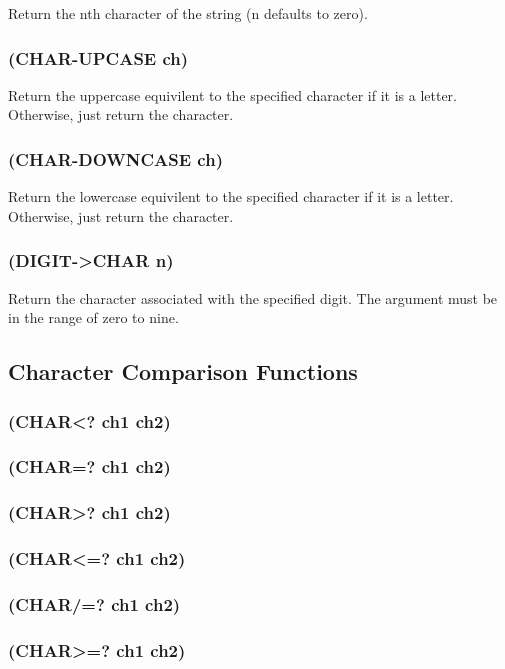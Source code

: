 \documentclass[11pt]{article}
\begin{document}
Return the nth character of the string (n defaults to zero).
\subsubsection{(CHAR-UPCASE ch)}
\label{sec-4-30-9}

Return the uppercase equivilent to the specified character if it is a
letter.  Otherwise, just return the character.
\subsubsection{(CHAR-DOWNCASE ch)}
\label{sec-4-30-10}

Return the lowercase equivilent to the specified character if it is a
letter.  Otherwise, just return the character.
\subsubsection{(DIGIT->CHAR n)}
\label{sec-4-30-11}

Return the character associated with the specified digit.  The
argument must be in the range of zero to nine.
\subsection{Character Comparison Functions}
\label{sec-4-31}

\subsubsection{(CHAR<? ch1 ch2)}
\label{sec-4-31-1}
\subsubsection{(CHAR=? ch1 ch2)}
\label{sec-4-31-2}
\subsubsection{(CHAR>? ch1 ch2)}
\label{sec-4-31-3}
\subsubsection{(CHAR<=? ch1 ch2)}
\label{sec-4-31-4}
\subsubsection{(CHAR/=? ch1 ch2)}
\label{sec-4-31-5}
\subsubsection{(CHAR>=? ch1 ch2)}
\label{sec-4-31-6}
\end{document}
